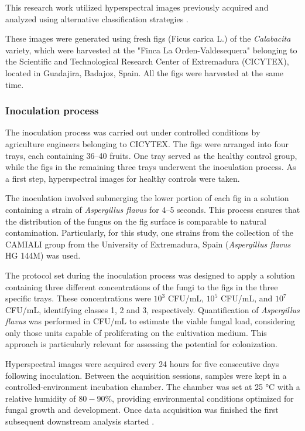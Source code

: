 \documentclass[runningheads]{llncs}
\begin{document}
This research work utilized hyperspectral images previously acquired and analyzed using alternative classification strategies \cite{cruz-carrasco_detection_2024}. 

These images were generated using fresh figs (Ficus carica L.) of the \textit{Calabacita} variety, which were harvested at the "Finca La Orden-Valdesequera" belonging to the Scientific and Technological Research Center of Extremadura (CICYTEX), located in Guadajira, Badajoz, Spain. All the figs were harvested at the same time.

\subsubsection{Inoculation process}
The inoculation process was carried out under controlled conditions by agriculture engineers belonging to CICYTEX. The figs were arranged into four trays, each containing 36--40 fruits. One tray served as the healthy control group, while the figs in the remaining three trays underwent the inoculation process. 
As a first step, hyperspectral images for healthy controls were taken.

The inoculation involved submerging the lower portion of each fig in a solution containing a strain of \textit{Aspergillus flavus} for 4--5 seconds. This process ensures that the distribution of the fungus on the fig surface is comparable to natural contamination. Particularly, for this study, one strains from the collection of the CAMIALI group from the University of Extremadura, Spain (\textit{Aspergillus flavus} HG 144M) was used.

The protocol set during the inoculation process was designed to apply a solution containing three different concentrations of the fungi to the figs in the three specific trays. These concentrations were $10^3$ CFU/mL,  $10^5$ CFU/mL, and $10^7$ CFU/mL, identifying classes 1, 2 and 3, respectively. Quantification of \textit{Aspergillus flavus} was performed in CFU/mL to estimate the viable fungal load, considering only those units capable of proliferating on the cultivation medium. This approach is particularly relevant for assessing the potential for colonization.

Hyperspectral images were acquired every 24 hours for five consecutive days following inoculation. Between the acquisition sessions, samples were kept in a controlled-environment incubation chamber. The chamber was set at 25 °C with a relative humidity of $80-90\%$, providing environmental conditions optimized for fungal growth and development. Once data acquisition was finished the first subsequent downstream analysis started \cite{cruz-carrasco_detection_2024}.
\end{document}

